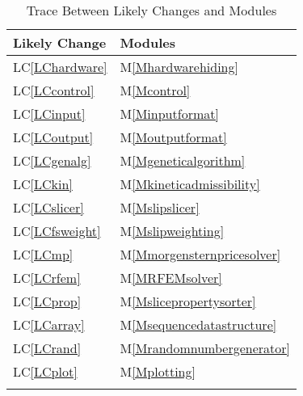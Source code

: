 \documentclass[12pt]{article}
\begin{document}
\begin{longtable}{l l}
\toprule
Likely Change & Modules
\\
\midrule
LC\ref{LChardware} & M\ref{Mhardwarehiding}
\\
LC\ref{LCcontrol} & M\ref{Mcontrol}
\\
LC\ref{LCinput} & M\ref{Minputformat}
\\
LC\ref{LCoutput} & M\ref{Moutputformat}
\\
LC\ref{LCgenalg} & M\ref{Mgeneticalgorithm}
\\
LC\ref{LCkin} & M\ref{Mkineticadmissibility}
\\
LC\ref{LCslicer} & M\ref{Mslipslicer}
\\
LC\ref{LCfsweight} & M\ref{Mslipweighting}
\\
LC\ref{LCmp} & M\ref{Mmorgensternpricesolver}
\\
LC\ref{LCrfem} & M\ref{MRFEMsolver}
\\
LC\ref{LCprop} & M\ref{Mslicepropertysorter}
\\
LC\ref{LCarray} & M\ref{Msequencedatastructure}
\\
LC\ref{LCrand} & M\ref{Mrandomnumbergenerator}
\\
LC\ref{LCplot} & M\ref{Mplotting}
\\
\bottomrule
\caption{Trace Between Likely Changes and Modules}
\label{Table:TBLCaM}
\end{longtable}
\end{document}
